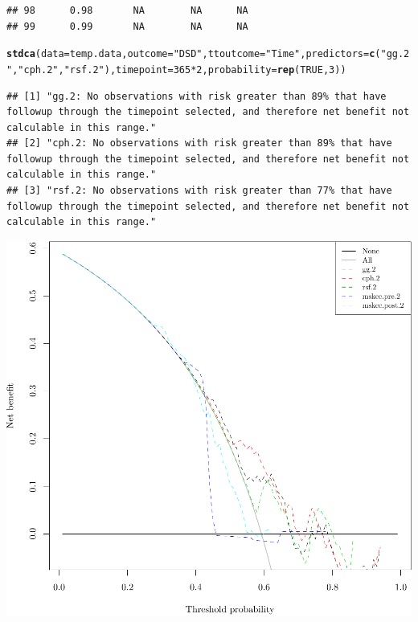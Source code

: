 \documentclass{article}\usepackage[]{graphicx}\usepackage[]{color}
\makeatletter
\def\maxwidth{ %
  \ifdim\Gin@nat@width>\linewidth
    \linewidth
  \else
    \Gin@nat@width
  \fi
}
\newcommand{\hlnum}[1]{\textcolor[rgb]{0.686,0.059,0.569}{#1}}%
\newcommand{\hlstr}[1]{\textcolor[rgb]{0.192,0.494,0.8}{#1}}%
\newcommand{\hlopt}[1]{\textcolor[rgb]{0,0,0}{#1}}%
\newcommand{\hlstd}[1]{\textcolor[rgb]{0.345,0.345,0.345}{#1}}%
\newcommand{\hlkwc}[1]{\textcolor[rgb]{0.333,0.667,0.333}{#1}}%
\newcommand{\hlkwd}[1]{\textcolor[rgb]{0.737,0.353,0.396}{\textbf{#1}}}%
\newenvironment{kframe}{%
 \def\at@end@of@kframe{}%
 \ifinner\ifhmode%
  \def\at@end@of@kframe{\end{minipage}}%
  \begin{minipage}{\columnwidth}%
 \fi\fi%
 \def\FrameCommand##1{\hskip\@totalleftmargin \hskip-\fboxsep
 \colorbox{shadecolor}{##1}\hskip-\fboxsep
     \hskip-\linewidth \hskip-\@totalleftmargin \hskip\columnwidth}%
 \MakeFramed {\advance\hsize-\width
   \@totalleftmargin\z@ \linewidth\hsize
   \@setminipage}}%
 {\par\unskip\endMakeFramed%
 \at@end@of@kframe}
\newenvironment{knitrout}{}{} %
\makeatother
\begin{document}
\begin{knitrout}
\begin{kframe}
\begin{verbatim}
## 98      0.98       NA        NA      NA
## 99      0.99       NA        NA      NA
\end{verbatim}
\begin{alltt}
\hlkwd{stdca}\hlstd{(}\hlkwc{data} \hlstd{= temp.data,} \hlkwc{outcome} \hlstd{=} \hlstr{"DSD"}\hlstd{,} \hlkwc{ttoutcome} \hlstd{=} \hlstr{"Time"}\hlstd{,} \hlkwc{predictors} \hlstd{=} \hlkwd{c}\hlstd{(}\hlstr{"gg.2"}\hlstd{,} \hlstr{"cph.2"}\hlstd{,} \hlstr{"rsf.2"}\hlstd{),} \hlkwc{timepoint} \hlstd{=} \hlnum{365}\hlopt{*}\hlnum{2}\hlstd{,} \hlkwc{probability} \hlstd{=} \hlkwd{rep}\hlstd{(}\hlnum{TRUE}\hlstd{,} \hlnum{3}\hlstd{))}
\end{alltt}
\begin{verbatim}
## [1] "gg.2: No observations with risk greater than 89% that have followup through the timepoint selected, and therefore net benefit not calculable in this range." 
## [2] "cph.2: No observations with risk greater than 89% that have followup through the timepoint selected, and therefore net benefit not calculable in this range."
## [3] "rsf.2: No observations with risk greater than 77% that have followup through the timepoint selected, and therefore net benefit not calculable in this range."
\end{verbatim}
\end{kframe}

{\centering \includegraphics[width=\maxwidth]{figure/05-model-selection-dca-2} 

}
\end{knitrout}
\end{document}
